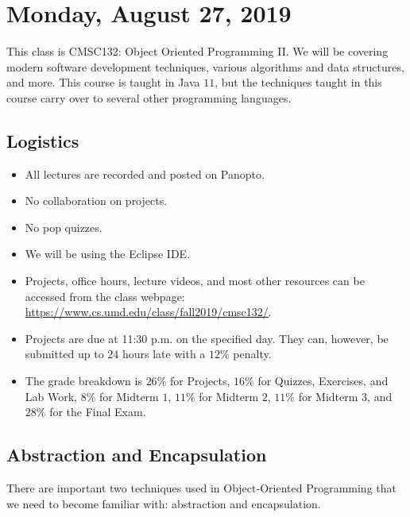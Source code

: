 \section{Monday, August 27, 2019}
This class is CMSC132: Object Oriented Programming II. We will be covering modern software development techniques, various algorithms and data structures, and more. This course is taught in Java $11$, but the techniques taught in this course carry over to several other programming languages.
\subsection{Logistics}
\begin{itemize}
    \item All lectures are recorded and posted on Panopto.
    \item No collaboration on projects.
    \item No pop quizzes.
    \item We will be using the Eclipse IDE.
    \item Projects, office hours, lecture videos, and most other resources can be accessed from the class webpage: \url{https://www.cs.umd.edu/class/fall2019/cmsc132/}.
    \item Projects are due at 11:30 p.m. on the specified day. They can, however, be submitted up to $24$ hours late with a $12\%$ penalty.  
    \item The grade breakdown is $26\%$ for Projects, $16\%$ for Quizzes, Exercises, and Lab Work, $8\%$ for Midterm $1$, $11\%$ for Midterm $2$, $11\%$ for Midterm $3$, and $28\%$ for the Final Exam. 
\end{itemize} 

\subsection{Abstraction and Encapsulation}
There are important two techniques used in Object-Oriented Programming that we need to become familiar with: abstraction and encapsulation. 

